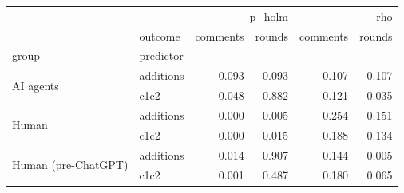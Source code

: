 \begin{tabular}{llrrrr}
\toprule
 &  & \multicolumn{2}{r}{p_holm} & \multicolumn{2}{r}{rho} \\
 & outcome & comments & rounds & comments & rounds \\
group & predictor &  &  &  &  \\
\midrule
\multirow[t]{2}{*}{AI agents} & additions & 0.093 & 0.093 & 0.107 & -0.107 \\
 & c1c2 & 0.048 & 0.882 & 0.121 & -0.035 \\
\cline{1-6}
\multirow[t]{2}{*}{Human} & additions & 0.000 & 0.005 & 0.254 & 0.151 \\
 & c1c2 & 0.000 & 0.015 & 0.188 & 0.134 \\
\cline{1-6}
\multirow[t]{2}{*}{Human (pre-ChatGPT)} & additions & 0.014 & 0.907 & 0.144 & 0.005 \\
 & c1c2 & 0.001 & 0.487 & 0.180 & 0.065 \\
\cline{1-6}
\bottomrule
\end{tabular}
